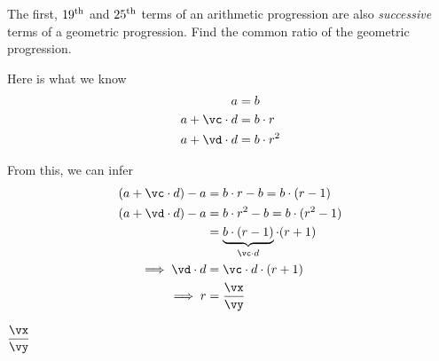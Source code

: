 


\SUBTRACT{}\vc
\SUBTRACT{}\vd
\SUBTRACT\vb\va\ve
\FRACTIONSIMPLIFY\ve\vc\vx\vy

\question[3] The first, $19^\text{th}$ and $25^\text{th}$ terms of an arithmetic progression are also 
\textit{successive} terms of a geometric progression. Find the common ratio of the geometric progression.

\watchout

\begin{solution}[\halfpage]
	Here is what we know 
	\begin{align}
		a &= b \\
		a + \vc\cdot d &= b\cdot r \\
		a + \vd\cdot d &= b\cdot r^2 
	\end{align}
	
	From this, we can infer 
	\begin{align}
		(a + \vc\cdot d) - a &= b\cdot r - b = b\cdot(r-1) \\
		(a + \vd\cdot d) - a &= b\cdot r^2 - b = b\cdot(r^2-1) \\ 
		&= \underbrace{b\cdot(r-1)}_{\vc\cdot d}\cdot(r+1) \\
		\implies \vd\cdot d &= \vc\cdot d \cdot (r + 1) \\ 
		\implies r &= \frac\vx\vy 
	\end{align}
\end{solution}

\ifprintanswers
  \begin{codex}
    $\dfrac\vx\vy$
  \end{codex}
\fi
